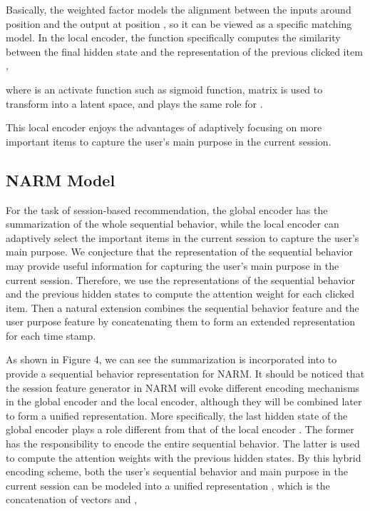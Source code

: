 \documentclass[sigconf]{acmart}
\begin{document}
Basically, the weighted factor  models the alignment between the inputs around position  and the output at position , so it can be viewed as a specific matching model. In the local encoder, the function  specifically computes the similarity between the final hidden state  and the representation of the previous clicked item ,
    
where  is an activate function such as sigmoid function, matrix  is used to transform  into a latent space, and  plays the same role for . 
  
This local encoder enjoys the advantages of adaptively focusing on more important items to capture the user's main purpose in the current session.

\subsection{NARM Model}
For the task of session-based recommendation, the global encoder has the summarization of the whole sequential behavior, while the local encoder can adaptively select the important items in the current session to capture the user's main purpose. We conjecture that the representation of the sequential behavior may provide useful information for capturing the user's main purpose in the current session. Therefore, we use the representations of the sequential behavior and the previous hidden states to compute the attention weight for each clicked item. Then a natural extension combines the sequential behavior feature and the user purpose feature by concatenating them to form an extended representation for each time stamp.
  
As shown in Figure 4, we can see the summarization  is incorporated into  to provide a sequential behavior representation for NARM. It should be noticed that the session feature generator in NARM will evoke different encoding mechanisms in the global encoder and the local encoder, although they will be combined later to form a unified representation. More specifically, the last hidden state of the global encoder  plays a role different from that of the local encoder . The former has the responsibility to encode the entire sequential behavior. The latter is used to compute the attention weights with the previous hidden states. By this hybrid encoding scheme, both the user's sequential behavior and main purpose in the current session can be modeled into a unified representation , which is the concatenation of vectors  and ,
    
\end{document}
